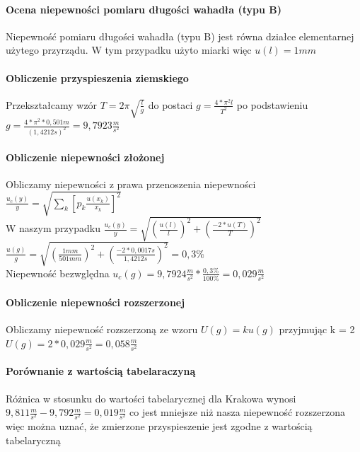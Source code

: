 \documentclass[a4paper,10pt,twoside]{article}
\begin{document}
	\paragraph{Ocena niepewności pomiaru długości wahadła (typu B)} Niepewność pomiaru długości wahadła (typu B) jest równa działce elementarnej użytego przyrządu. W tym przypadku użyto miarki więc $u(l) = 1mm$ 
	\\
	\paragraph{Obliczenie przyspieszenia ziemskiego} Przekształcamy wzór $T = 2\pi\sqrt{\frac{l}{g}} $ do postaci $g = \frac {4*\pi^2l}{T^2}$ po podstawieniu $g = \frac {4*\pi^2*0,501m}{(1,4212s)^2} = 9,7923\frac{m}{s^2}$
	\\
	\paragraph{Obliczenie niepewności złożonej}
	Obliczamy niepewności z prawa przenoszenia niepewności \\$\frac{u_c(y)}{y} = \sqrt{\sum_{k}[p_k\frac{u(x_k)}{x_k}]^2}$
	\\ W naszym przypadku $\frac{u_c(y)}{y} = \sqrt{\left(\frac{u(l)}{l}\right)^2 + \left(\frac{-2*u(T)}{T}\right)^2} $
	  $	\frac{u(g)}{g} = \sqrt{\left(\frac{1mm}{501mm}\right)^2 + \left(\frac{-2*0,0017s}{1,4212s}\right)^2} = 0,3\%$
	  \\Niepewność bezwględna $u_c(g) = 9,7924 \frac{m}{s^2} * \frac{0,3\%}{100\%} = 0,029\frac{m}{s^2}$
	  \\
	  \paragraph{Obliczenie niepewności rozszerzonej} Obliczamy niepewność rozszerzoną ze wzoru $U(g) = ku(g)$ przyjmując k = 2 $U(g) = 2*0,029 \frac{m}{s^2} = 0,058 \frac{m}{s^2}$
	  \\
	  \paragraph{Porównanie z wartością tabelaraczyną}  Różnica w stosunku do wartości tabelarycznej dla Krakowa wynosi $9,811 \frac{m}{s^2} - 9,792 \frac{m}{s^2} = 0,019  \frac{m}{s^2}$ co jest mniejsze niż nasza niepewność rozszerzona więc można uznać, że zmierzone przyspieszenie jest zgodne z wartością tabelaryczną 
	
\end{document}
